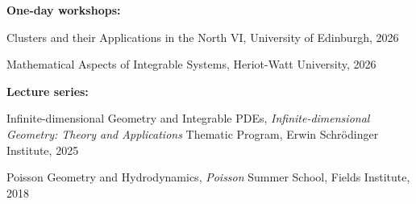 \documentclass[a4paper, 12pt]{article}
\begin{document}
\textbf{One-day workshops:}
\begin{compactitem} 
\item Clusters and their Applications in the North VI, University of Edinburgh, 2026
\item Mathematical Aspects of  Integrable Systems, Heriot-Watt University, 2026
\end{compactitem}\par\smallskip
\textbf{Lecture series:}
\begin{compactitem} \item {Infinite-dimensional Geometry and Integrable PDEs}, \emph{Infinite-dimensional Geometry: Theory and Applications} Thematic Program, Erwin Schr\"odinger Institute, 2025 \item {Poisson Geometry and Hydrodynamics}, \emph{Poisson} Summer School, Fields Institute, 2018
\end{compactitem}
\end{document}
